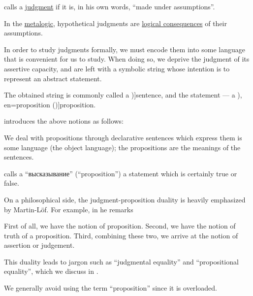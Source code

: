 \begin{concept}\label{con:hypothetical_judgment}
   calls a \hyperref[con:judgment]{judgment}  if it is, in his own words, \enquote{made under assumptions}.
\end{concept}
\begin{comments}
  \item In the \hyperref[con:metalogic]{metalogic}, hypothetical judgments are \hyperref[def:consequence_relation]{logical consequences} of their assumptions.
\end{comments}

\begin{concept}\label{con:proposition}
  In order to study judgments formally, we must encode them into some language that is convenient for us to study. When doing so, we deprive the judgment of its assertive capacity, and are left with a symbolic string whose intention is to represent an abstract statement.

  The obtained string is commonly called a \term[en=sentence (\cite[4]{Kleene2002Logic})]{sentence}, and the statement --- a \term[ru=высказывание (\cite[8]{Эдельман1975Логика}), en=proposition (\cite[4]{Kleene2002Logic})]{proposition}.
\end{concept}
\begin{comments}
  \item {} introduces the above notions as follows:
  \begin{displayquote}
    We deal with propositions through declarative sentences which express them is some language (the object language); the propositions are the
    meanings of the sentences.
  \end{displayquote}

   calls a \enquote{высказывание} (\enquote{proposition}) a statement which is certainly true or false.

  \item On a philosophical side, the judgment-proposition duality is heavily emphasized by Martin-L\"of. For example, in \cite[409]{MartinLöf1987Judgments} he remarks
  \begin{displayquote}
    First of all, we have the notion of proposition. Second, we have the notion of truth of a proposition. Third, combining these two, we arrive
at the notion of assertion or judgement.
  \end{displayquote}

  This duality leads to jargon such as \enquote{judgmental equality} and \enquote{propositional equality}, which we discuss in .

  \item We generally avoid using the term \enquote{proposition} since it is overloaded.
\end{comments}

